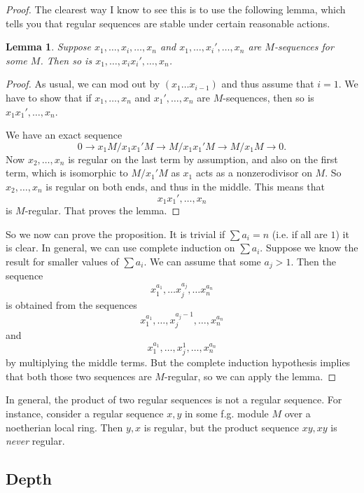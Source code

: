 \documentclass{article}
\newtheorem{lemma}{Lemma}
\begin{document}
\begin{proof}

The clearest way I know to see this is to use the following lemma, which tells
you that regular sequences are stable under certain reasonable actions.

\begin{lemma} 
Suppose $x_1, \dots, x_i, \dots, x_n$ and $x_1, \dots, x_i', \dots, x_n$ are
$M$-sequences for some $M$. Then so is $x_1, \dots, x_i x_i', \dots, x_n$.
\end{lemma} 

\begin{proof} 
As usual, we can mod out by $(x_1 \dots x_{i-1})$ and thus assume that $i=1$.
We have to show that if $x_1, \dots, x_n$ and $x_1', \dots, x_n$ are
$M$-sequences, then so is $x_1 x_1', \dots, x_n$.

We have an exact sequence
\[ 0 \to x_1 M/x_1 x_1' M \to M/x_1 x_1' M \to  M/x_1  M \to 0.  \]
Now $x_2, \dots, x_n$ is regular  on the last term by assumption, and also on
the first term, which is isomorphic to $M/x_1' M$ as $x_1$ acts as a
nonzerodivisor on $M$. So $x_2, \dots, x_n$ is regular on both ends, and thus
in the middle. This means that 
\[ x_1 x_1', \dots, x_n  \]
is $M$-regular. That proves the lemma. 
\end{proof} 

So we now can prove the proposition. It is trivial if $\sum a_i = n$ (i.e. if
all are $1$) it is clear. In general, we can use complete induction on $\sum
a_i$. Suppose we know the result for smaller values of $\sum a_i$. We can
assume that some $a_j >1$. 
Then  the sequence
\[ x_1^{a_1}, \dots x_j^{a_j} , \dots x_n^{a_n} \]
is obtained from the sequences
\[  x_1^{a_1}, \dots,x_j^{a_j - 1}, \dots, x_n^{a_n} \]
and
\[  x_1^{a_1}, \dots,x_j^{1}, \dots, x_n^{a_n} \]
by multiplying the middle terms. But the complete induction hypothesis implies
that both those two sequences are $M$-regular, so we can apply the lemma. 
\end{proof} 

In general, the product of two regular sequences is not a regular sequence. For
instance, consider a regular sequence $x,y$ in some f.g. module $M$ over a
noetherian local ring. Then $y,x$ is regular, but the product sequence $xy, xy$
is \emph{never} regular.


\subsection{Depth}
\end{document}
